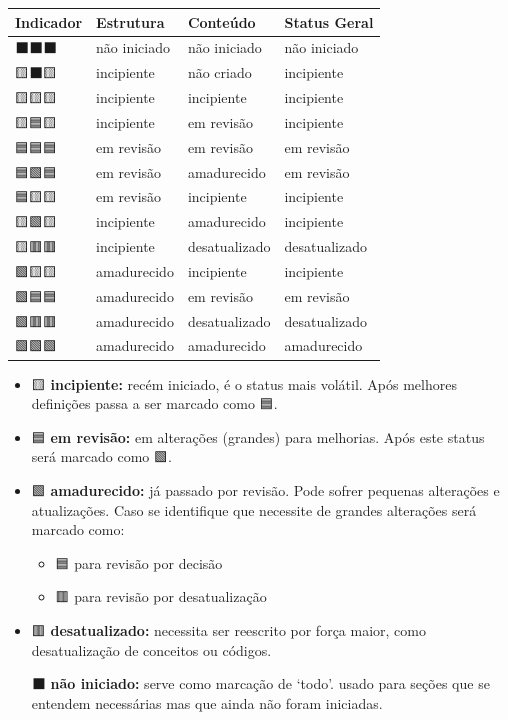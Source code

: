 \documentclass[
  letterpaper,
  DIV=11,
  numbers=noendperiod]{scrreprt}
\begin{document}
\begin{longtable}[]{@{}llll@{}}
\toprule()
Indicador & Estrutura & Conteúdo & Status Geral \\
\midrule()
\endhead
⬛⬛⬛ & não iniciado & não iniciado & não iniciado \\
🟨⬛🟨 & incipiente & não criado & incipiente \\
🟨🟨🟨 & incipiente & incipiente & incipiente \\
🟨🟦🟨 & incipiente & em revisão & incipiente \\
🟦🟦🟦 & em revisão & em revisão & em revisão \\
🟦🟩🟦 & em revisão & amadurecido & em revisão \\
🟦🟨🟨 & em revisão & incipiente & incipiente \\
🟨🟩🟨 & incipiente & amadurecido & incipiente \\
🟨🟥🟥 & incipiente & desatualizado & desatualizado \\
🟩🟨🟨 & amadurecido & incipiente & incipiente \\
🟩🟦🟦 & amadurecido & em revisão & em revisão \\
🟩🟥🟥 & amadurecido & desatualizado & desatualizado \\
🟩🟩🟩 & amadurecido & amadurecido & amadurecido \\
\bottomrule()
\end{longtable}

\begin{itemize}
\item
  🟨 \textbf{incipiente:} recém iniciado, é o status mais volátil. Após
  melhores definições passa a ser marcado como 🟦.
\item
  🟦 \textbf{em revisão:} em alterações (grandes) para melhorias. Após
  este status será marcado como 🟩.
\item
  🟩 \textbf{amadurecido:} já passado por revisão. Pode sofrer pequenas
  alterações e atualizações. Caso se identifique que necessite de
  grandes alterações será marcado como:

  \begin{itemize}
  \item
    🟦 para revisão por decisão
  \item
    🟥 para revisão por desatualização
  \end{itemize}
\item
  🟥 \textbf{desatualizado:} necessita ser reescrito por força maior,
  como desatualização de conceitos ou códigos.

  ⬛ \textbf{não iniciado:} serve como marcação de `todo'. usado para
  seções que se entendem necessárias mas que ainda não foram iniciadas.
\end{itemize}
\end{document}

